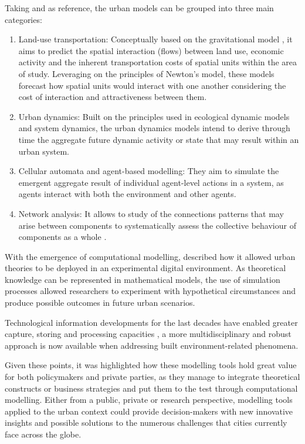 \documentclass[12pt, a4paper]{report}
\begin{document}
Taking \cite{battyUrbanModeling2009a} and \cite{wilsonFutureUrbanModelling2018} as reference, the urban models can be grouped into three main categories: 

\begin{enumerate}
  \item Land-use transportation: Conceptually based on the gravitational model \citep{battyUrbanModellingAlgorithms1976}, it aims to predict the spatial interaction (flows) between land use, economic activity and the inherent transportation costs of spatial units within the area of study. Leveraging on the principles of Newton's model, these models forecast how spatial units would  interact with one another considering the cost of interaction and attractiveness between them.
  \item Urban dynamics: Built on the principles used in ecological dynamic models and system dynamics, the urban dynamics models intend to derive through time the aggregate future dynamic activity or state that may result within an urban system.
  \item Cellular automata and agent-based modelling: They aim to simulate the emergent aggregate result of individual agent-level actions in a system, as agents interact with both the environment and other agents.
  \item Network analysis: It allows to study of the connections patterns that may arise between components to systematically assess the collective behaviour of components as a whole \citep{newmanNetworksIntroduction2010}.
\end{enumerate}

With the emergence of computational modelling, \cite{battyUrbanModeling2009a} described how it allowed urban theories to be deployed in an experimental digital environment. As theoretical knowledge can be represented in mathematical models, the use of simulation processes allowed researchers to experiment with hypothetical circumstances and produce possible outcomes in future urban scenarios. 

Technological information developments for the last decades have enabled greater capture, storing and processing capacities \citep{krainesIntegratingDistributedComputational2011}, a more multidisciplinary and robust approach is now available when addressing built environment-related phenomena. 



Given these points, it was highlighted how these modelling tools hold great value for both policymakers and private parties, as they manage to integrate theoretical constructs or business strategies and put them to the test through computational modelling. Either from a public, private or research perspective, modelling tools applied to the urban context could provide decision-makers with new innovative insights and possible solutions to the numerous challenges that cities currently face across the globe.
\end{document}
